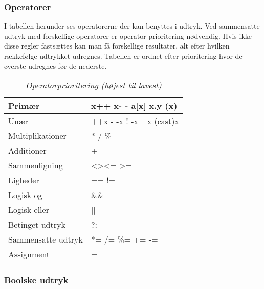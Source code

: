 \subsubsection{Operatorer}
I tabellen herunder ses operatorerne der kan benyttes i udtryk. Ved sammensatte udtryk med forskellige operatorer er operator prioritering nødvendig. Hvis ikke disse regler fastsættes kan man få forskellige resultater, alt efter hvilken rækkefølge udtrykket udregnes. Tabellen er ordnet efter prioritering hvor de øverste udregnes før de nederste. 
\begin{table}[H]
    \centering
    \begin{tabular}{|l|l|}
        \hline
        \centering

        Primær             & x++ \quad x- - \quad a{[}x{]} \quad x.y \quad (x)                 \\ \hline
        Unær               & ++x \quad - -x \quad ! \quad -x \quad +x \quad (cast)x       \\ \hline
        Multiplikationer   & * \quad / \quad \%                                               \\ \hline
        Additioner         & + \quad -                                                        \\ \hline
        Sammenligning      & \textless \quad \textgreater \quad \textless= \quad\textgreater= \\ \hline
        Ligheder           & == \quad !=                                                      \\ \hline
        Logisk og          & \&\&                                                              \\ \hline
        Logisk eller       & ||                                                               \\ \hline
        Betinget udtryk    & ?:                                                               \\ \hline
        Sammensatte udtryk & *= \quad /= \quad \%= \quad += \quad -=                          \\ \hline
        Assignment         & =                                                                \\ \hline

    \end{tabular}
    \caption{\textit{Operatorprioritering (højest til lavest)}}
    \label{tab:operatorprioritering}
\end{table}
\subsubsection{Boolske udtryk}

